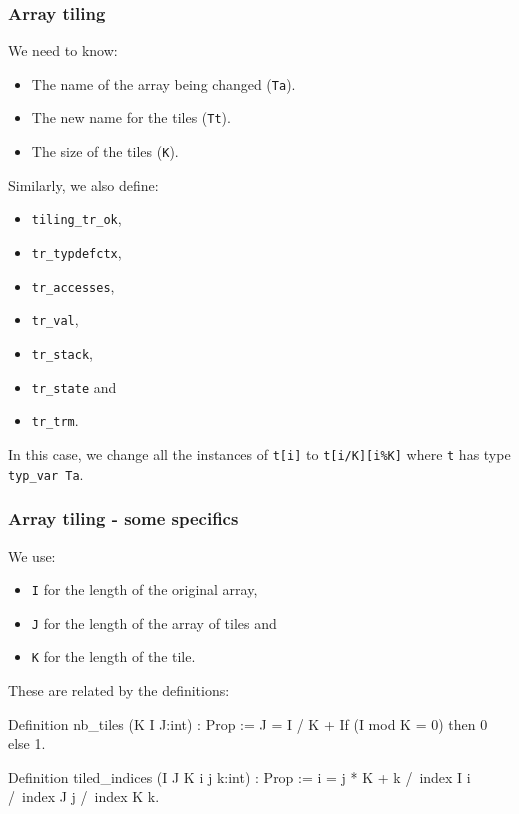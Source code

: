 \begin{frame}[fragile]
\frametitle{Array tiling}

We need to know:
\begin{itemize}
	\item The name of the array being changed (\texttt{Ta}).
	\item The new name for the tiles (\texttt{Tt}).
	\item The size of the tiles (\texttt{K}).
\end{itemize}

\bigskip \pause

Similarly, we also define:
\\[0.75em]
\begin{minipage}{0.45\linewidth}
\begin{itemize}
	\item \texttt{tiling\_tr\_ok},
	\item \texttt{tr\_typdefctx},
	\item \texttt{tr\_accesses},
	\item \texttt{tr\_val},
\end{itemize}
\end{minipage}%
\begin{minipage}{0.45\linewidth}
\begin{itemize}
	\item \texttt{tr\_stack},
	\item \texttt{tr\_state} and
	\item \texttt{tr\_trm}.
\end{itemize}
\end{minipage}

\bigskip

In this case, we change all the instances of \texttt{t[i]} to \texttt{t[i/K][i\%K]} where \texttt{t} has type \texttt{typ\_var Ta}.

\end{frame}


\begin{frame}[fragile]
\frametitle{Array tiling - some specifics}

We use:
\begin{itemize}
	\item \texttt{I} for the length of the original array,
	\item \texttt{J} for the length of the array of tiles and
	\item \texttt{K} for the length of the tile.
\end{itemize}

\bigskip

These are related by the definitions:

\begin{coq}
  Definition nb_tiles (K I J:int) : Prop :=
    J = I / K + If (I mod K = 0) then 0 else 1.

  Definition tiled_indices (I J K i j k:int) : Prop :=
  		i = j * K + k
	/\	index I i
	/\	index J j
  	/\	index K k.
\end{coq}

\end{frame}


